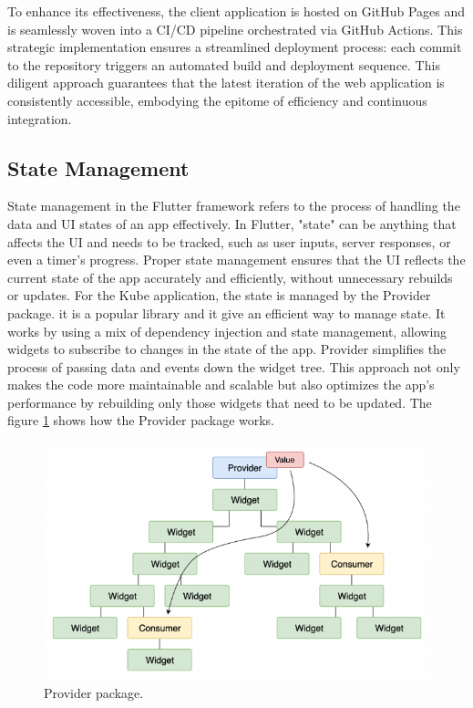To enhance its effectiveness, the client application is hosted on GitHub Pages and is seamlessly
woven into a CI/CD pipeline orchestrated via GitHub Actions. This strategic implementation ensures a
streamlined deployment process: each commit to the repository triggers an automated build and
deployment sequence. This diligent approach guarantees that the latest iteration of the web
application is consistently accessible, embodying the epitome of efficiency and continuous
integration.

\subsection{State Management}
State management in the Flutter framework refers to the process of handling the data and UI states
of an app effectively. In Flutter, "state" can be anything that affects the UI and needs to be
tracked, such as user inputs, server responses, or even a timer's progress. Proper state management
ensures that the UI reflects the current state of the app accurately and efficiently, without
unnecessary rebuilds or updates. For the Kube application, the state is managed by the Provider
package. it is a popular library and it give an efficient way to manage state. It works by using a
mix of dependency injection and state management, allowing widgets to subscribe to changes in the
state of the app. Provider simplifies the process of passing data and events down the widget tree.
This approach not only makes the code more maintainable and scalable but also optimizes the app's
performance by rebuilding only those widgets that need to be updated. The figure
\ref{fig:5_provider} shows how the Provider package works.

\begin{figure}
    \centering
    \includegraphics[scale=0.5]{Pictures/5_provider.png}
    \caption{Provider package.}
    \label{fig:5_provider}
\end{figure}

